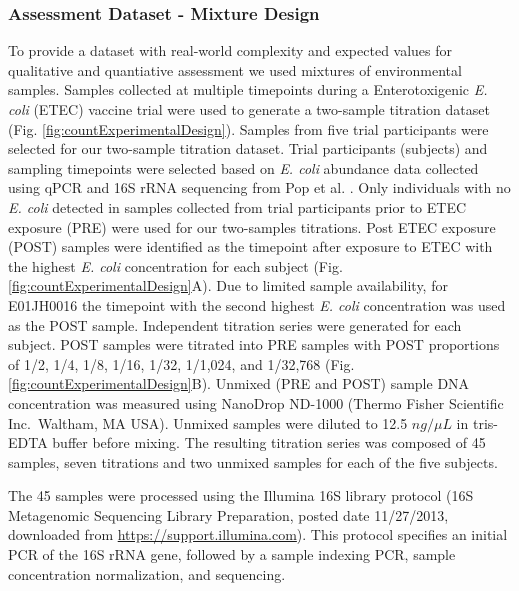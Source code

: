\documentclass{bmcart}
\begin{document}
\subsubsection*{Assessment Dataset - Mixture Design}
To provide a dataset with real-world complexity and expected values for  qualitative and quantiative assessment we used mixtures of environmental samples.
Samples collected at multiple timepoints during a Enterotoxigenic
\emph{E. coli} (ETEC) vaccine trial \cite{harro2011refinement} were
used to generate a two-sample titration dataset (Fig.
\ref{fig:countExperimentalDesign}). Samples from five trial
participants were selected for our two-sample titration dataset. Trial
participants (subjects) and sampling timepoints were selected based on
\emph{E. coli} abundance data collected using qPCR and 16S rRNA
sequencing from Pop et al. \cite{pop2016individual}. Only individuals with no
\emph{E. coli} detected in samples collected from trial participants
prior to ETEC exposure (PRE) were used for our two-samples titrations.
Post ETEC exposure (POST) samples were identified as the timepoint after
exposure to ETEC with the highest \emph{E. coli} concentration for each
subject (Fig. \ref{fig:countExperimentalDesign}A). Due to limited sample
availability, for E01JH0016 the timepoint with the second highest
\emph{E. coli} concentration was used as the POST sample. Independent
titration series were generated for each subject. POST samples
were titrated into PRE samples with POST proportions of 1/2, 1/4, 1/8,
1/16, 1/32, 1/1,024, and 1/32,768 (Fig.
\ref{fig:countExperimentalDesign}B). Unmixed (PRE and POST) sample DNA
concentration was measured using NanoDrop ND-1000 (Thermo Fisher
Scientific Inc.~Waltham, MA USA). Unmixed samples were diluted to 12.5
\(ng/\mu L\) in tris-EDTA buffer before mixing. The resulting titration series
was composed of 45 samples, seven titrations and two unmixed samples for each
of the five subjects.

The 45 samples were processed using the Illumina 16S library protocol
(16S Metagenomic Sequencing Library Preparation, posted date 11/27/2013,
downloaded from \url{https://support.illumina.com}). This protocol
specifies an initial PCR of the 16S rRNA gene, followed by a sample indexing
PCR, sample concentration normalization, and sequencing.
\end{document}

